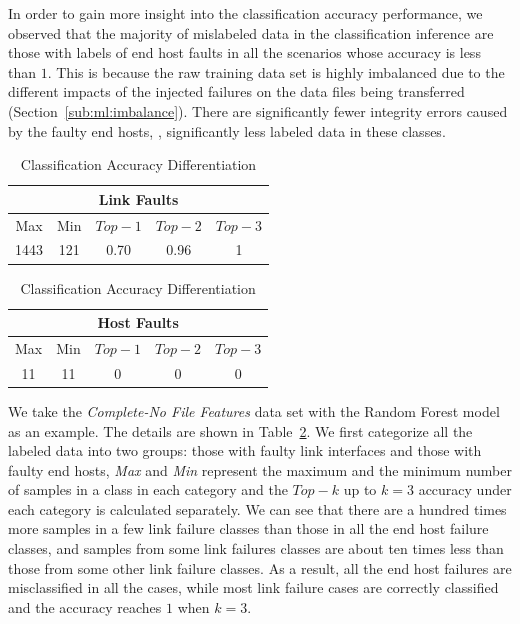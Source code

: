 In order to gain more insight into the classification accuracy performance, we observed that the majority of mislabeled data in the classification inference are those with labels of end host faults in all the scenarios whose accuracy is less than $1$.  This is because the raw training data set is highly imbalanced due to the different impacts of the injected failures on the data files being transferred (Section~\ref{sub:ml:imbalance}). There are significantly fewer integrity errors caused by the faulty end hosts, \ie, significantly less labeled data in these classes. 

\begin{table}[!ht]
\caption{Classification Accuracy Differentiation}
\label{tab:class}
\vspace{-0.1in}
\begin{center}
\begin{tabular}{ |c|c|c|c|c| } 
 \hline
  \multicolumn{5}{|c|}{Link Faults} \\
 \hline
 Max & Min & $Top-1$ & $Top-2$ & $Top-3$\\ 
 \hline
 1443 & 121  & 0.70 &  0.96 & 1 \\
 \hline
\end{tabular}

\begin{tabular}{ |c|c|c|c|c|} 
 \hline
\multicolumn{5}{|c|}{Host Faults} \\
 \hline
 Max & Min & $Top-1$ & $Top-2$ & $Top-3$ \\ 
 \hline
11 & 11  & 0 &  0 & 0\\
  \hline
\end{tabular}
\end{center}
\vspace{-0.2in}
\end{table}

We take the {\it Complete-No File Features} data set with the Random Forest model as an example. The details are shown in Table~\ref{tab:class}. We first categorize all the labeled data into two groups: those with faulty link interfaces and those with faulty end hosts, {\it Max} and {\it Min} represent the maximum and the minimum number of samples in a class in each category and the $Top-k$ up to $k=3$ accuracy under each category is calculated separately. We can see that there are a hundred times more samples in a few link failure classes than those in all the end host failure classes, and samples from some link failures classes are about ten times less than those from some other link failure classes. As a result, all the end host failures are misclassified in all the cases, while most link failure cases are correctly classified and the accuracy reaches $1$ when $k=3$.

